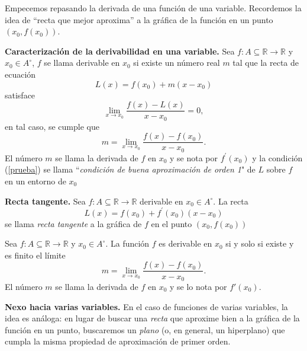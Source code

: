 \label{sec:diferenciabilidad}

Empecemos repasando la derivada de una funci\'on de una variable.  Recordemos la idea de ``recta que mejor aproxima'' a la gr\'afica de la funci\'on en un punto $(x_0, f(x_0)).$ 

\begin{definition} \textbf{Caracterización de la derivabilidad en una variable.}\label{recta_tangente}
Sea $f: A\subseteq  \mathbb{R}\to\mathbb{R}$ y $x_0 \in A^{\circ}$,   $f$ se  llama  derivable en $x_0$  si  existe un número real $m$ tal que la recta de ecuaci\'on
$$ L(x) = f(x_0) + m(x-x_0) $$    satisface
\begin{equation}\label{prueba}
 \lim_{x\to x_0} \frac{f(x) - L(x)}{x-x_0} = 0, 
\end{equation} en tal caso,  se cumple que \begin{equation}\label{pendiente}
 m = \lim_{x\to x_0} \frac{f(x) - f(x_0)}{x-x_0}.
\end{equation}   El n\'umero $m$ se llama la derivada de $f$ en $x_0$ y se nota por $ f^{'}(x_0)$ y  la condici\'on (\ref{prueba})  se llama   ``\emph{condición de buena aproximación de orden 1}" de $L$ sobre $f$ en un entorno de $x_0$ 
\end{definition}

\begin{definition}\textbf{Recta tangente.}   Sea $f: A\subseteq  \mathbb{R}\to\mathbb{R}$ derivable en $x_0 \in A^{\circ}$.   La recta 
 $$L(x) = f(x_0) + f^{'}(x_0)(x-x_0)$$ se llama  \emph{recta tangente} a la gr\'afica de $f$ en el punto $(x_0, f(x_0))$ 
\end{definition}


\begin{theorem}
Sea $f: A \subseteq \mathbb{R} \to \mathbb{R}$ y $x_0 \in A^{\circ}$. La función $f$ es derivable en $x_0$ si y solo si existe y es finito el límite
$$ m = \lim_{x \to x_0} \frac{f(x) - f(x_0)}{x-x_0}. $$
El n\'umero $m$ se llama la derivada de $f$ en $x_0$   y se lo nota por $f'(x_0)$.
\end{theorem}

\textbf{Nexo hacia varias variables.}  
En el caso de funciones de varias variables, la idea es análoga: 
en lugar de buscar una \emph{recta} que aproxime bien a la gr\'afica de la función en un punto, 
buscaremos un \emph{plano} (o, en general, un hiperplano) que cumpla la misma 
propiedad de aproximación de primer orden.















